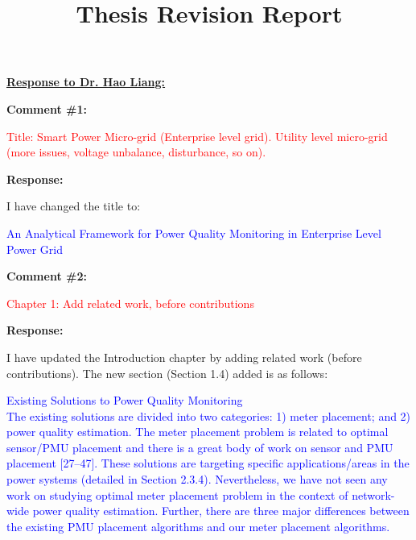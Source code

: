 \documentclass[journal]{IEEEtran}
\begin{document}
\title{Thesis Revision Report}
\maketitle

 \Large
\noindent \textbf{\underline{Response to Dr. Hao Liang:}}
 \large

\vspace{10pt}
\textbf{Comment \#1:}
\begin{adjustwidth}{2.5em}{0pt}
\singlespacing \vspace{-10pt}
\textcolor{red}{Title: Smart Power Micro-grid (Enterprise level grid). Utility level micro-grid (more issues, voltage unbalance, disturbance, so on).}
\end{adjustwidth}

\vspace{5pt}
\textbf{Response:}
\begin{adjustwidth}{2.5em}{0pt}
I have changed the title to:

\vspace{5pt}
\noindent\textcolor{blue}{An Analytical Framework for Power Quality Monitoring in Enterprise Level Power Grid}
\end{adjustwidth}
 
 
 
\vspace{30pt}
\textbf{Comment \#2:}
\begin{adjustwidth}{2.5em}{0pt}
\singlespacing \vspace{-10pt}
\textcolor{red}{Chapter 1: Add related work, before contributions}
\end{adjustwidth}

\vspace{5pt}
\textbf{Response:}
\begin{adjustwidth}{2.5em}{0pt}
I have updated the Introduction chapter by adding related work (before contributions). The new section (Section 1.4) added is as follows:
\end{adjustwidth}

\vspace{5pt}
\begin{adjustwidth}{2.5em}{0pt}
\noindent\textcolor{blue}{{\Large Existing Solutions to Power Quality Monitoring} \vspace{0.4em} \\
The existing solutions are divided into two categories: 1) meter placement; and 2) power quality estimation. The meter placement problem is related to optimal sensor/PMU placement and there is a great body of work on sensor and PMU placement [27--47]. These solutions are targeting specific applications/areas in the power systems (detailed in Section 2.3.4). Nevertheless, we have not seen any work on studying optimal meter placement problem in the context of network-wide power quality estimation. Further, there are three major differences between the existing PMU placement algorithms and our meter placement algorithms.}\end{adjustwidth}
\end{document}
